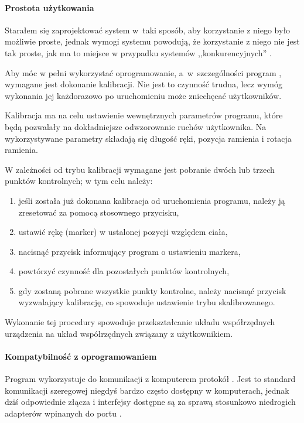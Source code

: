 
\paragraph{Prostota użytkowania}
Starałem się zaprojektować system w~taki sposób, aby korzystanie z niego było możliwie proste, jednak wymogi systemu powodują, że korzystanie z niego nie jest tak proste, jak ma to miejsce w przypadku systemów ,,konkurencyjnych'' .

Aby móc w pełni wykorzystać oprogramowanie, a~w~szczególności program , wymagane jest dokonanie kalibracji. Nie jest to czynność trudna, lecz wymóg wykonania jej każdorazowo po uruchomieniu może zniechęcać użytkowników.

Kalibracja ma na celu ustawienie wewnętrznych parametrów programu, które będą pozwalały na dokładniejsze odwzorowanie ruchów użytkownika. Na wykorzystywane parametry składają się długość ręki, pozycja ramienia i rotacja ramienia.

W zależności od trybu kalibracji wymagane jest pobranie dwóch lub trzech punktów kontrolnych; w tym celu należy:
\begin{enumerate}
 \item jeśli została już dokonana kalibracja od uruchomienia programu, należy ją zresetować za pomocą stosownego przycisku,
 \item ustawić rękę (marker) w ustalonej pozycji względem ciała,
 \item nacisnąć przycisk informujący program o ustawieniu markera,
 \item powtórzyć czynność dla pozostałych punktów kontrolnych,
 \item gdy zostaną pobrane wszystkie punkty kontrolne, należy nacisnąć przycisk wyzwalający kalibrację, co spowoduje ustawienie trybu skalibrowanego.
\end{enumerate}

Wykonanie tej procedury spowoduje przekształcanie układu współrzędnych urządzenia na układ współrzędnych związany z użytkownikiem.

\paragraph{Kompatybilność z oprogramowaniem}
Program wykorzystuje do komunikacji z komputerem protokół . Jest to standard komunikacji szeregowej niegdyś bardzo często dostępny w komputerach, jednak dziś odpowiednie złącza i interfejsy dostępne są za sprawą stosunkowo niedrogich adapterów wpinanych do portu .

